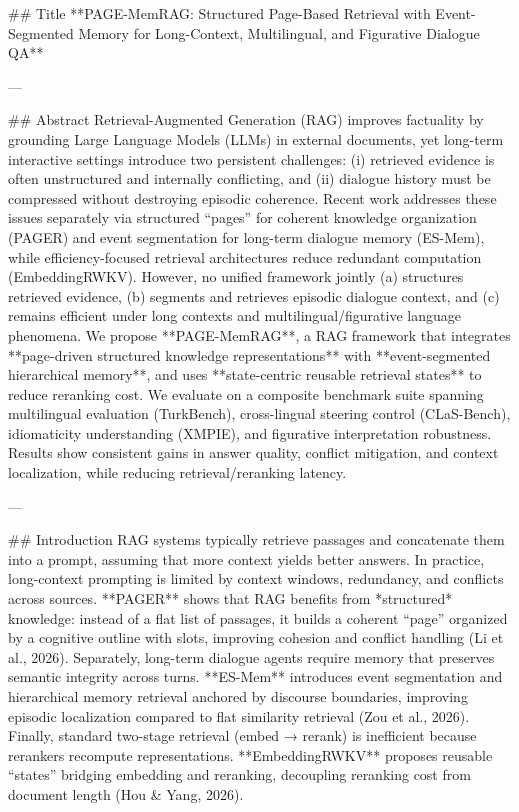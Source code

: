 ## Title  
**PAGE-MemRAG: Structured Page-Based Retrieval with Event-Segmented Memory for Long-Context, Multilingual, and Figurative Dialogue QA**

---

## Abstract  
Retrieval-Augmented Generation (RAG) improves factuality by grounding Large Language Models (LLMs) in external documents, yet long-term interactive settings introduce two persistent challenges: (i) retrieved evidence is often unstructured and internally conflicting, and (ii) dialogue history must be compressed without destroying episodic coherence. Recent work addresses these issues separately via structured “pages” for coherent knowledge organization (PAGER) and event segmentation for long-term dialogue memory (ES-Mem), while efficiency-focused retrieval architectures reduce redundant computation (EmbeddingRWKV). However, no unified framework jointly (a) structures retrieved evidence, (b) segments and retrieves episodic dialogue context, and (c) remains efficient under long contexts and multilingual/figurative language phenomena.  
We propose **PAGE-MemRAG**, a RAG framework that integrates **page-driven structured knowledge representations** with **event-segmented hierarchical memory**, and uses **state-centric reusable retrieval states** to reduce reranking cost. We evaluate on a composite benchmark suite spanning multilingual evaluation (TurkBench), cross-lingual steering control (CLaS-Bench), idiomaticity understanding (XMPIE), and figurative interpretation robustness. Results show consistent gains in answer quality, conflict mitigation, and context localization, while reducing retrieval/reranking latency.

---

## Introduction  
RAG systems typically retrieve passages and concatenate them into a prompt, assuming that more context yields better answers. In practice, long-context prompting is limited by context windows, redundancy, and conflicts across sources. **PAGER** shows that RAG benefits from *structured* knowledge: instead of a flat list of passages, it builds a coherent “page” organized by a cognitive outline with slots, improving cohesion and conflict handling (Li et al., 2026).  
Separately, long-term dialogue agents require memory that preserves semantic integrity across turns. **ES-Mem** introduces event segmentation and hierarchical memory retrieval anchored by discourse boundaries, improving episodic localization compared to flat similarity retrieval (Zou et al., 2026).  
Finally, standard two-stage retrieval (embed → rerank) is inefficient because rerankers recompute representations. **EmbeddingRWKV** proposes reusable “states” bridging embedding and reranking, decoupling reranking cost from document length (Hou & Yang, 2026).  

